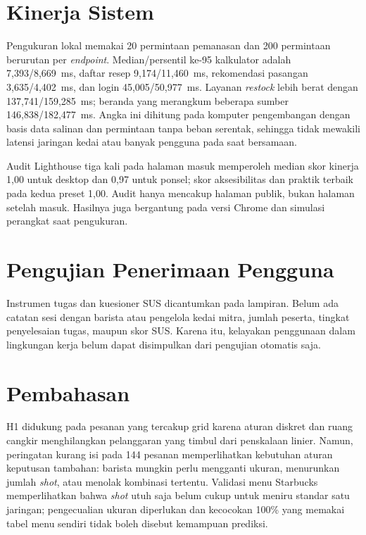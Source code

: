 \section{Kinerja Sistem}
\label{sec:hasil-kinerja}

Pengukuran lokal memakai 20 permintaan pemanasan dan 200 permintaan berurutan per \textit{endpoint}. Median/persentil ke-95 kalkulator adalah 7,393/8,669~ms, daftar resep 9,174/11,460~ms, rekomendasi pasangan 3,635/4,402~ms, dan login 45,005/50,977~ms. Layanan \textit{restock} lebih berat dengan 137,741/159,285~ms; beranda yang merangkum beberapa sumber 146,838/182,477~ms. Angka ini dihitung pada komputer pengembangan dengan basis data salinan dan permintaan tanpa beban serentak, sehingga tidak mewakili latensi jaringan kedai atau banyak pengguna pada saat bersamaan.

Audit Lighthouse tiga kali pada halaman masuk memperoleh median skor kinerja 1,00 untuk desktop dan 0,97 untuk ponsel; skor aksesibilitas dan praktik terbaik pada kedua preset 1,00. Audit hanya mencakup halaman publik, bukan halaman setelah masuk. Hasilnya juga bergantung pada versi Chrome dan simulasi perangkat saat pengukuran.

\section{Pengujian Penerimaan Pengguna}
\label{sec:hasil-uat}

Instrumen tugas dan kuesioner SUS dicantumkan pada lampiran. Belum ada catatan sesi dengan barista atau pengelola kedai mitra, jumlah peserta, tingkat penyelesaian tugas, maupun skor SUS. Karena itu, kelayakan penggunaan dalam lingkungan kerja belum dapat disimpulkan dari pengujian otomatis saja.

\section{Pembahasan}
\label{sec:pembahasan}

H1 didukung pada pesanan yang tercakup grid karena aturan diskret dan ruang cangkir menghilangkan pelanggaran yang timbul dari penskalaan linier. Namun, peringatan kurang isi pada 144 pesanan memperlihatkan kebutuhan aturan keputusan tambahan: barista mungkin perlu mengganti ukuran, menurunkan jumlah \textit{shot}, atau menolak kombinasi tertentu. Validasi menu Starbucks memperlihatkan bahwa \textit{shot} utuh saja belum cukup untuk meniru standar satu jaringan; pengecualian ukuran diperlukan dan kecocokan 100\% yang memakai tabel menu sendiri tidak boleh disebut kemampuan prediksi.

